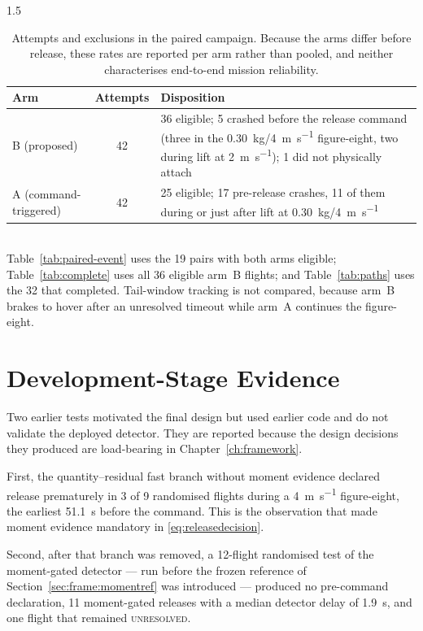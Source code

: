 \begin{spacing}{1.5}
\begin{table}[ht]
\centering
\caption{Attempts and exclusions in the paired campaign. Because the arms differ
before release, these rates are reported per arm rather than pooled, and neither
characterises end-to-end mission reliability.}
\label{tab:attempts}
\small
\begin{tabularx}{\textwidth}{@{}l c X@{}}
\toprule
\textbf{Arm} & \textbf{Attempts} & \textbf{Disposition} \\
\midrule
B (proposed) & 42 & 36 eligible; 5 crashed before the release command (three in
the \SI{0.30}{\kg}/\SI{4}{\meter\per\second} figure-eight, two during lift at
\SI{2}{\meter\per\second}); 1 did not physically attach \\
A (command-triggered) & 42 & 25 eligible; 17 pre-release crashes, 11 of them
during or just after lift at \SI{0.30}{\kg}/\SI{4}{\meter\per\second} \\
\bottomrule
\end{tabularx}
\\[4pt]
\footnotesize Table~\ref{tab:paired-event} uses the 19 pairs with both arms
eligible; Table~\ref{tab:complete} uses all 36 eligible arm~B flights; and
Table~\ref{tab:paths} uses the 32 that completed. Tail-window tracking is not
compared, because arm~B brakes to hover after an unresolved timeout while arm~A
continues the figure-eight.
\end{table}

\section{Development-Stage Evidence}\label{sec:eval:devstage}

Two earlier tests motivated the final design but used earlier code and do not
validate the deployed detector. They are reported because the design decisions
they produced are load-bearing in Chapter~\ref{ch:framework}.

First, the quantity--residual fast branch without moment evidence declared release
prematurely in 3 of 9 randomised flights during a \SI{4}{\meter\per\second}
figure-eight, the earliest \SI{51.1}{\second} before the command. This is the
observation that made moment evidence mandatory in \eqref{eq:releasedecision}.

Second, after that branch was removed, a 12-flight randomised test of the
moment-gated detector --- run before the frozen reference of
Section~\ref{sec:frame:momentref} was introduced --- produced no pre-command
declaration, 11 moment-gated releases with a median detector delay of
\SI{1.9}{\second}, and one flight that remained \textsc{unresolved}.

\end{spacing}
\newpage
